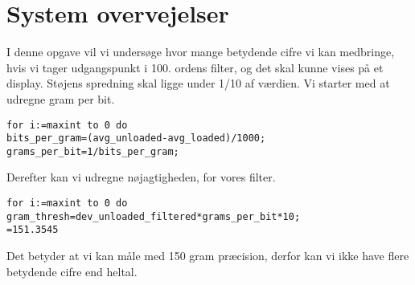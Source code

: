 \graphicspath{{Chapters/Opgave3/}}

\chapter{System overvejelser}

I denne opgave vil vi undersøge hvor mange betydende cifre vi kan medbringe, hvis vi tager udgangspunkt i 100. ordens filter, og det skal kunne vises på et display. Støjens spredning skal ligge under 1/10 af værdien.
Vi starter med at udregne gram per bit.

\begin{lstlisting}[frame=single]  % Start your code-block
for i:=maxint to 0 do
bits_per_gram=(avg_unloaded-avg_loaded)/1000;
grams_per_bit=1/bits_per_gram;
\end{lstlisting}
Derefter kan vi udregne nøjagtigheden, for vores filter.

\begin{lstlisting}[frame=single]  % Start your code-block
for i:=maxint to 0 do
gram_thresh=dev_unloaded_filtered*grams_per_bit*10;
=151.3545
\end{lstlisting}
Det betyder at vi kan måle med 150 gram præcision, derfor kan vi ikke have flere betydende cifre end heltal. 

